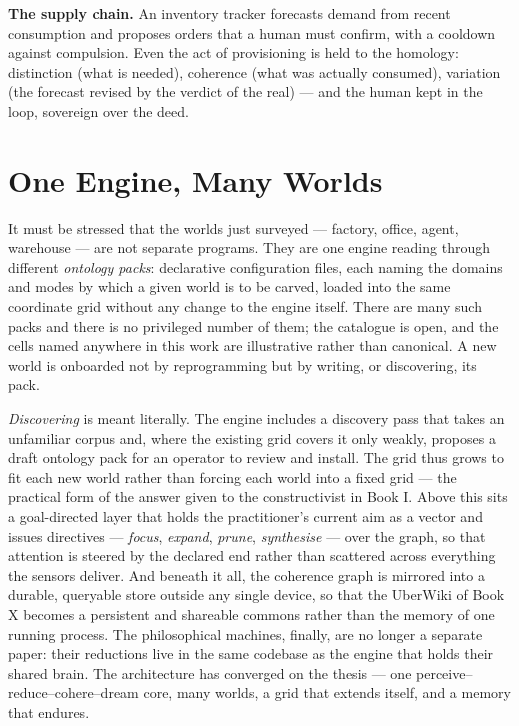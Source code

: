 \textbf{The supply chain.} An inventory tracker forecasts demand from recent
consumption and proposes orders that a human must confirm, with a
cooldown against compulsion. Even the act of provisioning is held to the
homology: distinction (what is needed), coherence (what was actually consumed),
variation (the forecast revised by the verdict of the real) --- and the human
kept in the loop, sovereign over the deed.

\section*{One Engine, Many Worlds}

It must be stressed that the worlds just surveyed --- factory, office, agent,
warehouse --- are not separate programs. They are one engine reading through
different \emph{ontology packs}: declarative configuration files, each naming the
domains and modes by which a given world is to be carved, loaded into the same
coordinate grid without any change to the engine itself. There are many such packs
and there is no privileged number of them; the catalogue is open, and the cells
named anywhere in this work are illustrative rather than canonical. A new world is
onboarded not by reprogramming but by writing, or discovering, its pack.

\emph{Discovering} is meant literally. The engine includes a discovery pass that
takes an unfamiliar corpus and, where the existing grid covers it only weakly,
proposes a draft ontology pack for an operator to review and install. The grid thus grows to fit each new world rather
than forcing each world into a fixed grid --- the practical form of the answer
given to the constructivist in Book I. Above this sits a goal-directed layer that
holds the practitioner's current aim as a vector and issues directives ---
\emph{focus}, \emph{expand}, \emph{prune}, \emph{synthesise} --- over the graph, so
that attention is steered by the declared end rather than scattered across
everything the sensors deliver. And beneath it all, the coherence graph is
mirrored into a durable, queryable store outside any single device, so that the
UberWiki of Book X becomes a persistent and shareable commons rather than the
memory of one running process. The philosophical machines, finally, are no
longer a separate paper: their reductions live in the same codebase as the engine
that holds their shared brain. The architecture has converged on the thesis ---
one perceive--reduce--cohere--dream core, many worlds, a grid that extends itself,
and a memory that endures.

